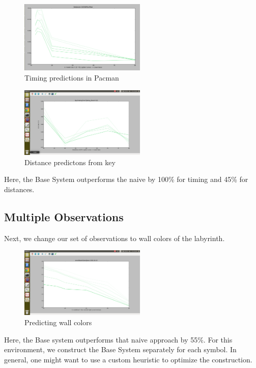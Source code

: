 \documentclass{acm_proc_article-sp}
\begin{document}
\begin{figure}[ht!]
\centering
\includegraphics[width=60mm]{lucasplots/pacman10000.png}
\caption{Timing predictions in Pacman \label{overflow}}
\end{figure}


\begin{figure}[ht!]
\centering
\includegraphics[width=60mm]{lucasplots/Distances.png}
\caption{Distance predictons from key \label{overflow}}
\end{figure}

Here, the Base System outperforms the naive by 100\% for timing and 45\% for distances.

\subsection{Multiple Observations}

Next, we change our set of observations to wall colors of the labyrinth. 

\begin{figure}[ht!]
\centering
\includegraphics[width=60mm]{lucasplots/MO:16,32.png}
\caption{Predicting wall colors \label{overflow}}
\end{figure}

Here, the Base system outperforms that naive approach by 55\%. For this environment, we construct the Base System separately for each symbol. In general, one might want to use a custom heuristic to optimize the construction.
\end{document}
